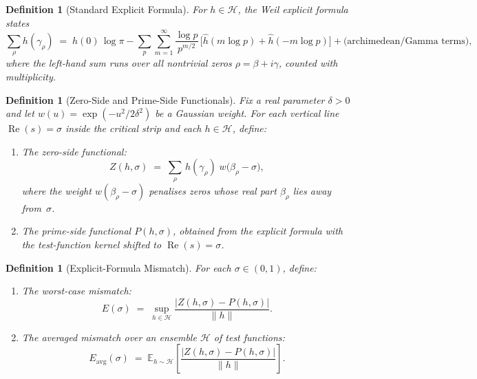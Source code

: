 \documentclass[11pt]{article}
\newtheorem{definition}[theorem]{Definition}
\theoremstyle{remark}
\DeclareMathOperator{\Rea}{Re}
\begin{document}

\begin{definition}[Standard Explicit Formula]
\label{def:explicit-formula}
For $h\in\mathcal{H}$, the Weil explicit formula states
\[
  \sum_{\rho} h(\gamma_{\rho})
  \;=\;
  \widehat{h}(0)\,\log\pi
  - \sum_{p}\sum_{m=1}^{\infty}
    \frac{\log p}{p^{m/2}}\,
    \bigl[\hat{h}(m\log p) + \hat{h}(-m\log p)\bigr]
  + \text{(archimedean/Gamma terms)},
\]
where the left-hand sum runs over all nontrivial zeros $\rho = \beta+i\gamma$,
counted with multiplicity.
\end{definition}


\begin{definition}[Zero-Side and Prime-Side Functionals]
\label{def:ZP-functionals}
Fix a real parameter $\delta > 0$ and let
$w(u) = \exp(-u^{2}/2\delta^{2})$ be a Gaussian weight.
For each vertical line $\Rea(s)=\sigma$ inside the critical strip
and each $h\in\mathcal{H}$, define:
\begin{enumerate}
\item[\textbf{(Z)}]
  The \emph{zero-side functional}:
  \[
    Z(h,\sigma)
    \;=\;
    \sum_{\rho}\, h(\gamma_{\rho})\;
    w\!\bigl(\beta_{\rho}-\sigma\bigr),
  \]
  where the weight $w(\beta_{\rho}-\sigma)$ penalises zeros whose
  real part $\beta_{\rho}$ lies away from~$\sigma$.

\item[\textbf{(P)}]
  The \emph{prime-side functional} $P(h,\sigma)$, obtained from the
  explicit formula with the test-function kernel shifted to
  $\Rea(s)=\sigma$.
\end{enumerate}
\end{definition}


\begin{definition}[Explicit-Formula Mismatch]
\label{def:ef-mismatch}
For each $\sigma\in(0,1)$, define:
\begin{enumerate}
\item[\textbf{(i)}]
  The \emph{worst-case mismatch}:
  \[
    E(\sigma)
    \;=\;
    \sup_{h\in\mathcal{H}}
    \frac{\bigl\lvert Z(h,\sigma) - P(h,\sigma)\bigr\rvert}
         {\lVert h\rVert}.
  \]
\item[\textbf{(ii)}]
  The \emph{averaged mismatch} over an ensemble $\mathcal{H}$ of
  test functions:
  \[
    E_{\mathrm{avg}}(\sigma)
    \;=\;
    \mathbb{E}_{h\sim\mathcal{H}}\!\left[
    \frac{\bigl\lvert Z(h,\sigma) - P(h,\sigma)\bigr\rvert}
         {\lVert h\rVert}
    \right].
  \]
\end{enumerate}
\end{definition}
\end{document}
